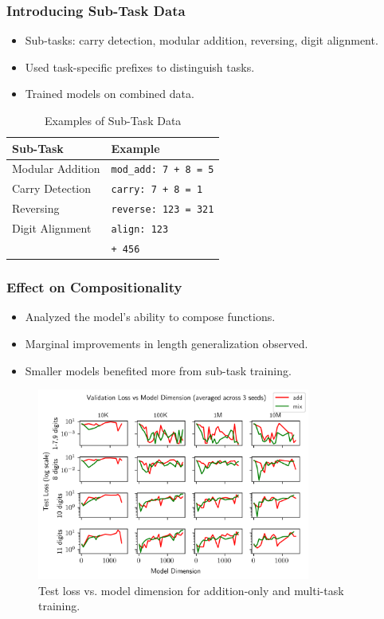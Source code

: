 \documentclass[14pt,aspectratio=169]{beamer}
\theoremstyle{remark}
\begin{document}
\begin{frame}
    \frametitle{Introducing Sub-Task Data}
    \begin{itemize}
        \item Sub-tasks: carry detection, modular addition, reversing, digit alignment.
        \item Used task-specific prefixes to distinguish tasks.
        \item Trained models on combined data.
    \end{itemize}
    \begin{table}
        \centering
        \caption{Examples of Sub-Task Data}
        \begin{tabular}{ll}
            \toprule
            Sub-Task         & Example                       \\
            \midrule
            Modular Addition & \texttt{mod\_add: 7 + 8 = 5}  \\
            Carry Detection  & \texttt{carry: 7 + 8 = 1}     \\
            Reversing        & \texttt{reverse: 123 = 321}   \\
            Digit Alignment  & \texttt{align:  123}          \\
                             & \hspace{1.2cm} \texttt{+ 456} \\
            \bottomrule
        \end{tabular}
    \end{table}
\end{frame}

\begin{frame}
    \frametitle{Effect on Compositionality}
    \begin{itemize}
        \item Analyzed the model's ability to compose functions.
        \item Marginal improvements in length generalization observed.
        \item Smaller models benefited more from sub-task training.
    \end{itemize}
    \begin{figure}
        \centering
        \includegraphics[width=0.8\textwidth]{fig/exp_27_val_loss_vs_n_embd.png}
        \caption{Test loss vs. model dimension for addition-only and multi-task training.}
    \end{figure}
\end{frame}
\end{document}
